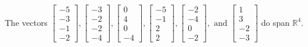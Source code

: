 \begin{exercise}
\begin{exerciseStatement}
  \end{exerciseStatement}
  \begin{exerciseAnswer}
   The vectors \(\left[\begin{array}{r}
-5 \\
-3 \\
-1 \\
-2
\end{array}\right] , \left[\begin{array}{r}
-3 \\
-2 \\
-2 \\
-4
\end{array}\right] , \left[\begin{array}{r}
0 \\
4 \\
0 \\
-4
\end{array}\right] , \left[\begin{array}{r}
-5 \\
-1 \\
2 \\
2
\end{array}\right] , \left[\begin{array}{r}
-2 \\
-4 \\
0 \\
-2
\end{array}\right] , \text{ and } \left[\begin{array}{r}
1 \\
3 \\
-2 \\
-3
\end{array}\right]\) 
  	 do  
	span \(\mathbb{R}^4\).
  


  \end{exerciseAnswer}
\end{exercise}